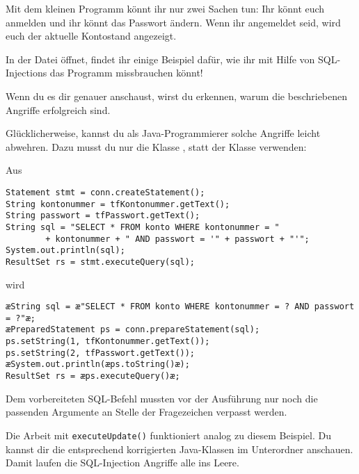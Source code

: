 Mit dem kleinen Programm könnt ihr nur zwei Sachen tun: Ihr könnt euch anmelden
und ihr könnt das Passwort ändern. Wenn ihr angemeldet seid, wird euch der
aktuelle Kontostand angezeigt.

In der Datei  öffnet, findet ihr einige
Beispiel dafür, wie ihr mit Hilfe von SQL-Injections das Programm missbrauchen
könnt!

Wenn du es dir genauer anschaust, wirst du erkennen, warum die beschriebenen
Angriffe erfolgreich sind.

Glücklicherweise, kannst du als Java-Programmierer solche Angriffe leicht
abwehren. Dazu musst du nur die Klasse , statt der
Klasse  verwenden:

Aus

\begin{lstlisting}
Statement stmt = conn.createStatement();
String kontonummer = tfKontonummer.getText();
String passwort = tfPasswort.getText();
String sql = "SELECT * FROM konto WHERE kontonummer = " 
        + kontonummer + " AND passwort = '" + passwort + "'";
System.out.println(sql);
ResultSet rs = stmt.executeQuery(sql);
\end{lstlisting}

wird

\begin{lstlisting}
æString sql = æ"SELECT * FROM konto WHERE kontonummer = ? AND passwort = ?"æ;
æPreparedStatement ps = conn.prepareStatement(sql); 
ps.setString(1, tfKontonummer.getText());
ps.setString(2, tfPasswort.getText());
æSystem.out.println(æps.toString()æ);
ResultSet rs = æps.executeQuery()æ;
\end{lstlisting}

Dem vorbereiteten SQL-Befehl mussten vor der Ausführung nur noch die passenden
Argumente an Stelle der Fragezeichen verpasst werden.

Die Arbeit mit \lstinline|executeUpdate()| funktioniert analog zu diesem
Beispiel. Du kannst dir die entsprechend korrigierten Java-Klassen im
Unterordner  anschauen. Damit laufen die SQL-Injection
Angriffe alle ins Leere.
